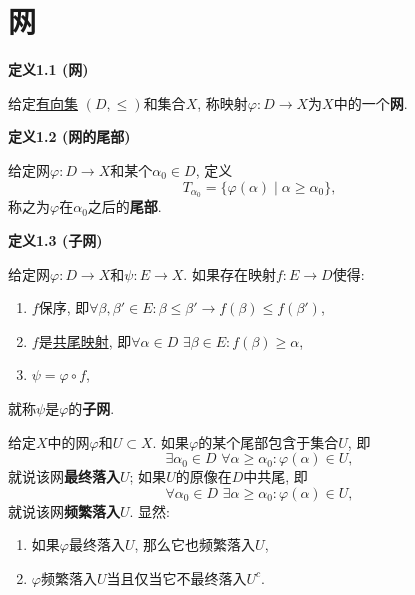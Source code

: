 \documentclass[UTF8]{ctexart}
\begin{document}
\setlength{\abovedisplayskip}{1pt}
\setlength{\belowdisplayskip}{1pt}

\section{网}

\hypertarget{sec:定义1.1}{}
\noindent\textbf{定义1.1 (网)}

给定\href{../../01 基础集合论/04 序理论/01 序关系/01 预序关系#nameddest=sec:定义2.1}{有向集}
$(D,\leqslant)$和集合$X$, 称映射$\varphi:D\to X$为$X$中的一个\textbf{网}.

\vspace{10pt}

\hypertarget{sec:定义1.2}{}
\noindent\textbf{定义1.2 (网的尾部)}

给定网$\varphi:D\to X$和某个$\alpha_0\in D$, 定义
\[
    T_{\alpha_0}=\{\varphi(\alpha)\mid\alpha\geqslant\alpha_0\},
\]
称之为$\varphi$在$\alpha_0$之后的\textbf{尾部}.

\vspace{10pt}

\hypertarget{sec:定义1.3}{}
\noindent\textbf{定义1.3 (子网)}

给定网$\varphi:D\to X$和$\psi:E\to X$. 如果存在映射$f:E\to D$使得:
\begin{enumerate}
    \item $f$保序, 即$\forall\beta,\beta'\in E:\beta\leqslant\beta'\to
    f(\beta)\leqslant f(\beta')$,
    \item $f$是\href{../../01 基础集合论/04 序理论/01 序关系/01 预序关系#nameddest=sec:定义3.2}
    {共尾映射}, 即$\forall\alpha\in D\,\,\exists\beta\in E:f(\beta)\geqslant\alpha$,
    \item $\psi=\varphi\circ f$,
\end{enumerate}
就称$\psi$是$\varphi$的\textbf{子网}.

\vspace{10pt}

给定$X$中的网$\varphi$和$U\subset X$. 如果$\varphi$的某个尾部包含于集合$U$, 即
\[
    \exists\alpha_0\in D\,\,\forall\alpha\geqslant\alpha_0:\varphi(\alpha)\in U,
\]
就说该网\textbf{最终落入}$U$; 如果$U$的原像在$D$中共尾, 即
\[
    \forall\alpha_0\in D\,\,\exists\alpha\geqslant\alpha_0:\varphi(\alpha)\in U,
\]
就说该网\textbf{频繁落入}$U$. 显然:
\begin{enumerate}
    \item 如果$\varphi$最终落入$U$, 那么它也频繁落入$U$,
    \item $\varphi$频繁落入$U$当且仅当它不最终落入$U^c$.
\end{enumerate}
\end{document}
